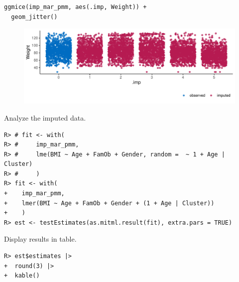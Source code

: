 \documentclass[
  article]{jss}
\begin{document}
\begin{verbatim}
ggmice(imp_mar_pmm, aes(.imp, Weight)) + 
  geom_jitter()
\end{verbatim}

\begin{figure}[h]

{\centering \includegraphics{manuscript_files/figure-pdf/obesity-predmar_pmm1-2.pdf}

}

\end{figure}

Analyze the imputed data.

\begin{verbatim}
R> # fit <- with(
R> #     imp_mar_pmm,
R> #     lme(BMI ~ Age + FamOb + Gender, random =  ~ 1 + Age | Cluster)
R> #     )
R> fit <- with(
+    imp_mar_pmm,
+    lmer(BMI ~ Age + FamOb + Gender + (1 + Age | Cluster))
+    )
R> est <- testEstimates(as.mitml.result(fit), extra.pars = TRUE)
\end{verbatim}

Display results in table.

\begin{verbatim}
R> est$estimates |> 
+  round(3) |>
+  kable()
\end{verbatim}
\end{document}

